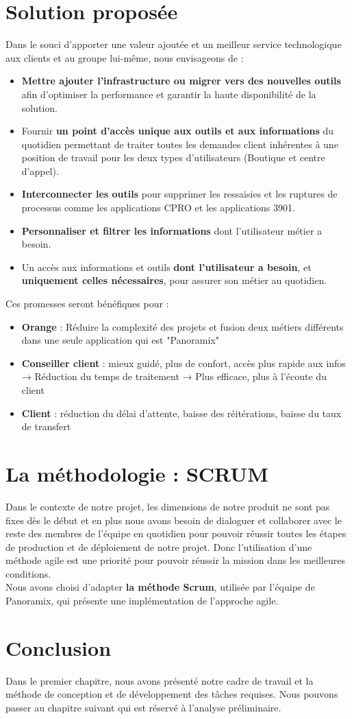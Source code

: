 \section[Solution proposée]{Solution proposée}
Dans le souci d’apporter une valeur ajoutée et un meilleur service technologique aux clients et au groupe lui-même, nous envisageons de :
\begin{itemize}
	\item \textbf{Mettre ajouter l'infrastructure ou migrer vers des nouvelles outils} afin d'optimiser la performance et garantir la haute disponibilité de la solution.
	\item Fournir \textbf{un point d’accès unique aux outils et aux informations} du quotidien permettant de traiter toutes les demandes client inhérentes à une position de travail pour les deux types d'utilisateurs (Boutique et centre d’appel).
	\item \textbf{Interconnecter les outils} pour supprimer les ressaisies et les ruptures de processus comme les applications CPRO et les applications 3901.
	\item \textbf{Personnaliser et filtrer les informations} dont l’utilisateur métier a besoin.
	\item Un accès aux informations et outils \textbf{dont l’utilisateur a besoin}, et \textbf{uniquement celles nécessaires}, pour assurer son métier au quotidien.
	
\end{itemize}
Ces promesses seront bénéfiques pour :
\begin{itemize}
	\item \textbf{Orange} : Réduire la complexité des projets et fusion deux métiers différents dans une seule application qui est "Panoramix" \\
	\item \textbf{Conseiller client } : mieux guidé, plus de confort, accès plus rapide aux infos
	\subitem → Réduction du temps  de traitement
	\subitem → Plus efficace, plus à l’écoute du client
	\item \textbf{Client} : réduction du délai d’attente, baisse des réitérations, baisse du taux de transfert
\end{itemize}
\section[La méthodologie : SCRUM]{La méthodologie : SCRUM}
Dans le contexte de notre projet, les dimensions de notre produit ne sont pas fixes dès le début et en plus nous avons besoin de dialoguer  et collaborer avec le reste des membres de l’équipe en quotidien pour pouvoir réussir toutes les étapes de production et de déploiement de notre projet. Donc l’utilisation d’une méthode agile est une priorité pour pouvoir réussir la mission dans les meilleures conditions. 
\\
Nous avons choisi d’adapter \textbf{la méthode Scrum}, utilisée par l’équipe de Panoramix, qui présente une implémentation de l’approche agile.
\section*{Conclusion}
Dans le premier chapitre, nous avons présenté notre cadre de travail et la méthode de conception et de développement des tâches requises. Nous pouvons passer au chapitre suivant qui est réservé à l’analyse préliminaire.